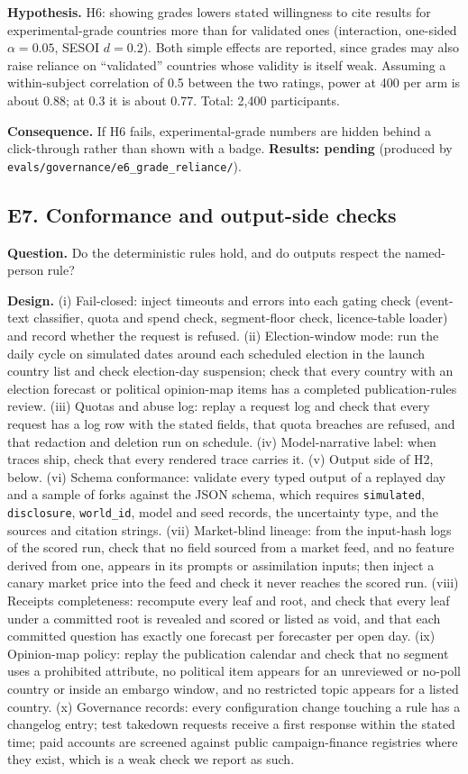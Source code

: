 \documentclass[11pt]{article}
\newcommand{\pending}[1]{\textbf{Results: pending} (produced by \nolinkurl{#1}).}
\begin{document}
\textbf{Hypothesis.} H6: showing grades lowers stated willingness to cite results for experimental-grade countries more than for validated ones (interaction, one-sided $\alpha=0.05$, SESOI $d=0.2$). Both simple effects are reported, since grades may also raise reliance on ``validated'' countries whose validity is itself weak. Assuming a within-subject correlation of 0.5 between the two ratings, power at 400 per arm is about 0.88; at 0.3 it is about 0.77. Total: 2,400 participants.

\textbf{Consequence.} If H6 fails, experimental-grade numbers are hidden behind a click-through rather than shown with a badge.
\pending{evals/governance/e6_grade_reliance/}

\subsection{E7. Conformance and output-side checks}
\textbf{Question.} Do the deterministic rules hold, and do outputs respect the named-person rule?

\textbf{Design.} (i) Fail-closed: inject timeouts and errors into each gating check (event-text classifier, quota and spend check, segment-floor check, licence-table loader) and record whether the request is refused. (ii) Election-window mode: run the daily cycle on simulated dates around each scheduled election in the launch country list and check election-day suspension; check that every country with an election forecast or political opinion-map items has a completed publication-rules review. (iii) Quotas and abuse log: replay a request log and check that every request has a log row with the stated fields, that quota breaches are refused, and that redaction and deletion run on schedule. (iv) Model-narrative label: when traces ship, check that every rendered trace carries it. (v) Output side of H2, below. (vi) Schema conformance: validate every typed output of a replayed day and a sample of forks against the JSON schema, which requires \texttt{simulated}, \texttt{disclosure}, \texttt{world\_id}, model and seed records, the uncertainty type, and the sources and citation strings. (vii) Market-blind lineage: from the input-hash logs of the scored run, check that no field sourced from a market feed, and no feature derived from one, appears in its prompts or assimilation inputs; then inject a canary market price into the feed and check it never reaches the scored run. (viii) Receipts completeness: recompute every leaf and root, and check that every leaf under a committed root is revealed and scored or listed as void, and that each committed question has exactly one forecast per forecaster per open day. (ix) Opinion-map policy: replay the publication calendar and check that no segment uses a prohibited attribute, no political item appears for an unreviewed or no-poll country or inside an embargo window, and no restricted topic appears for a listed country. (x) Governance records: every configuration change touching a rule has a changelog entry; test takedown requests receive a first response within the stated time; paid accounts are screened against public campaign-finance registries where they exist, which is a weak check we report as such.
\end{document}
